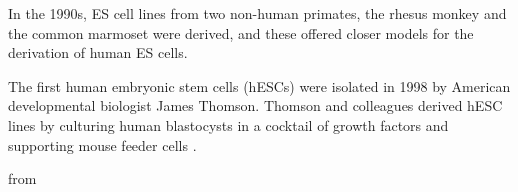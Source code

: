 In the 1990s, ES cell lines from two non-human primates, the rhesus monkey \cite{thomson1995isolation} and the common marmoset\cite{thomson1996pluripotent} were derived, and these offered closer models for the derivation of human ES cells. 

The first human embryonic stem cells (hESCs) were isolated in 1998 by American developmental biologist James Thomson.
Thomson and colleagues derived hESC lines by culturing human blastocysts in a cocktail of growth factors and supporting mouse feeder cells \cite{thomson1998embryonic}. 

from \cite{department2006regenerative}


